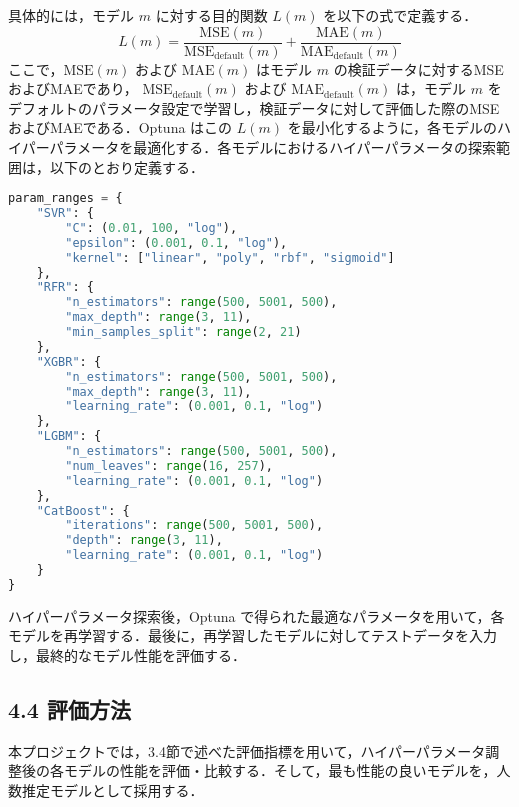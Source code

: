具体的には，モデル \( m \) に対する目的関数 \( L(m) \) を以下の式で定義する．
\begin{equation}
L(m) = \frac{\mathrm{MSE}(m)}{\mathrm{MSE}_{\mathrm{default}}(m)} + \frac{\mathrm{MAE}(m)}{\mathrm{MAE}_{\mathrm{default}}(m)}
\end{equation}
ここで，\( \mathrm{MSE}(m) \) および \( \mathrm{MAE}(m) \) はモデル \( m \) の検証データに対するMSEおよびMAEであり，  
\( \mathrm{MSE}_{\mathrm{default}}(m) \) および \( \mathrm{MAE}_{\mathrm{default}}(m) \) は，モデル \( m \) をデフォルトのパラメータ設定で学習し，検証データに対して評価した際のMSEおよびMAEである．Optuna はこの \( L(m) \) を最小化するように，各モデルのハイパーパラメータを最適化する．各モデルにおけるハイパーパラメータの探索範囲は，以下のとおり定義する．
\begin{lstlisting}[style=mystyle, language=Python, caption=各モデルのハイパーパラメータ探索範囲]
param_ranges = {
    "SVR": {
        "C": (0.01, 100, "log"),
        "epsilon": (0.001, 0.1, "log"),
        "kernel": ["linear", "poly", "rbf", "sigmoid"]
    },
    "RFR": {
        "n_estimators": range(500, 5001, 500),
        "max_depth": range(3, 11),
        "min_samples_split": range(2, 21)
    },
    "XGBR": {
        "n_estimators": range(500, 5001, 500),
        "max_depth": range(3, 11),
        "learning_rate": (0.001, 0.1, "log")
    },
    "LGBM": {
        "n_estimators": range(500, 5001, 500),
        "num_leaves": range(16, 257),
        "learning_rate": (0.001, 0.1, "log")
    },
    "CatBoost": {
        "iterations": range(500, 5001, 500),
        "depth": range(3, 11),
        "learning_rate": (0.001, 0.1, "log")
    }
}
\end{lstlisting}
ハイパーパラメータ探索後，Optuna で得られた最適なパラメータを用いて，各モデルを再学習する．最後に，再学習したモデルに対してテストデータを入力し，最終的なモデル性能を評価する．

\subsection*{4.4 評価方法}
本プロジェクトでは，3.4節で述べた評価指標を用いて，ハイパーパラメータ調整後の各モデルの性能を評価・比較する．そして，最も性能の良いモデルを，人数推定モデルとして採用する．

